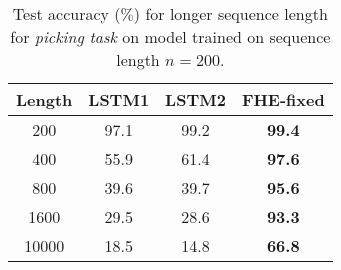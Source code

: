 \begin{table}[t]
\caption{Test accuracy ($\%$) for longer sequence length for \emph{picking task} on model trained on sequence length \mbox{$n = 200$}.}
\label{table:pickingGeneralization}
\vskip 0.1in
\begin{center}
\begin{small}
\begin{sc}
\begin{tabular}{c || c c | c} 
\toprule
\textbf{Length} & \textbf{LSTM1} & \textbf{LSTM2} & \textbf{FHE-fixed}\\
\midrule
200 & 97.1 & 99.2 & \textbf{99.4}\\
400 & 55.9 & 61.4 & \textbf{97.6}\\
800 & 39.6 & 39.7 & \textbf{95.6}\\
1600 &  29.5 & 28.6  & \textbf{93.3}  \\
10000 &  18.5 & 14.8 & \textbf{66.8} \\
\bottomrule
\end{tabular}
\end{sc}
\end{small}
\end{center}
\vskip -0.25in
\end{table}

